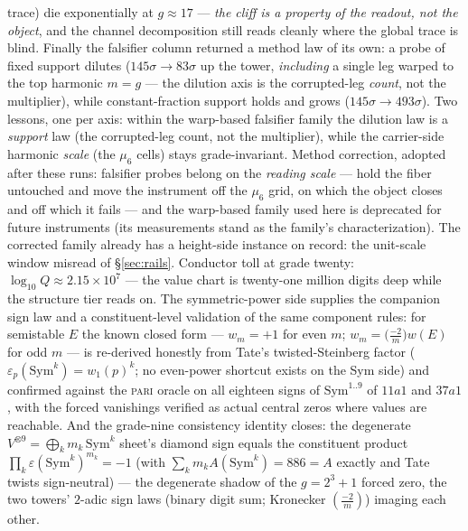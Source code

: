 \documentclass[11pt]{article}
\theoremstyle{definition}
\theoremstyle{remark}
\begin{document}
trace) die exponentially at $g\approx17$ --- \emph{the cliff is a property of
the readout, not the object}, and the channel decomposition still reads
cleanly where the global trace is blind. Finally the falsifier column
returned a method law of its own: a probe of fixed support dilutes
($145\sigma\to83\sigma$ up the tower, \emph{including} a single leg warped to
the top harmonic $m=g$ --- the dilution axis is the corrupted-leg
\emph{count}, not the multiplier), while constant-fraction support holds and
grows ($145\sigma\to493\sigma$). Two lessons, one per axis: within the
warp-based falsifier family the dilution law is a \emph{support} law (the
corrupted-leg count, not the multiplier), while the carrier-side harmonic
\emph{scale} (the $\mu_6$ cells) stays grade-invariant. Method correction,
adopted after these runs: falsifier probes belong on the \emph{reading
scale} --- hold the fiber untouched and move the instrument off the $\mu_6$
grid, on which the object closes and off which it fails --- and the
warp-based family used here is deprecated for future instruments (its
measurements stand as the family's characterization). The corrected family
already has a height-side instance on record: the unit-scale window misread
of \S\ref{sec:rails}. Conductor toll at grade twenty: $\log_{10}Q\approx2.15\times10^7$
--- the value chart is twenty-one million digits deep while the structure
tier reads on. The symmetric-power side supplies the companion sign law and
a constituent-level validation of the same component rules: for semistable
$E$ the known closed form \cite{DMW,SaitoEps} --- $w_m=+1$ for even $m$;
$w_m=\bigl(\tfrac{-2}{m}\bigr)w(E)$ for odd $m$ --- is re-derived honestly
from Tate's twisted-Steinberg factor
($\varepsilon_p(\mathrm{Sym}^k)=w_1(p)^k$; no even-power shortcut exists on
the Sym side) and confirmed against the \textsc{pari} oracle on all eighteen
signs of $\mathrm{Sym}^{1..9}$ of $11a1$ and $37a1$, with the forced
vanishings verified as actual central zeros where values are reachable. And
the grade-nine consistency identity closes: the degenerate
$V^{\otimes9}=\bigoplus_k m_k\,\mathrm{Sym}^k$ sheet's diamond sign equals
the constituent product $\prod_k\varepsilon(\mathrm{Sym}^k)^{m_k}=-1$
(with $\sum_k m_kA(\mathrm{Sym}^k)=886=A$ exactly and Tate twists
sign-neutral) --- the degenerate shadow of the $g=2^3+1$ forced zero, the
two towers' $2$-adic sign laws (binary digit sum; Kronecker
$(\tfrac{-2}{m})$) imaging each other.
\end{document}
